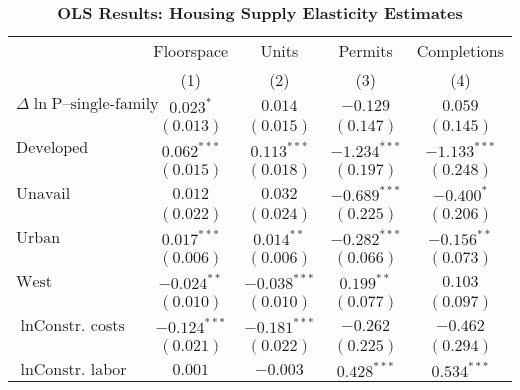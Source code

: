 
\begin{table}[H]
\caption{\textbf{OLS Results: Housing Supply Elasticity Estimates}}
\begin{center}
\begin{footnotesize}
\begin{threeparttable}
\begin{tabular}{l c c c c}
\toprule
 & \multicolumn{1}{c}{Floorspace} & \multicolumn{1}{c}{Units} & \multicolumn{1}{c}{Permits} & \multicolumn{1}{c}{Completions} \\
\cmidrule(lr){2-2} \cmidrule(lr){3-3} \cmidrule(lr){4-4} \cmidrule(lr){5-5}
 & (1) & (2) & (3) & (4) \\
\midrule
$\Delta\ln{\text{P--single-family}}$ & $0.023^{*}$    & $0.014$        & $-0.129$       & $0.059$        \\
                                     & $(0.013)$      & $(0.015)$      & $(0.147)$      & $(0.145)$      \\
$\text{Developed}$                   & $0.062^{***}$  & $0.113^{***}$  & $-1.234^{***}$ & $-1.133^{***}$ \\
                                     & $(0.015)$      & $(0.018)$      & $(0.197)$      & $(0.248)$      \\
$\text{Unavail}$                     & $0.012$        & $0.032$        & $-0.689^{***}$ & $-0.400^{*}$   \\
                                     & $(0.022)$      & $(0.024)$      & $(0.225)$      & $(0.206)$      \\
$\text{Urban}$                       & $0.017^{***}$  & $0.014^{**}$   & $-0.282^{***}$ & $-0.156^{**}$  \\
                                     & $(0.006)$      & $(0.006)$      & $(0.066)$      & $(0.073)$      \\
$\text{West}$                        & $-0.024^{**}$  & $-0.038^{***}$ & $0.199^{**}$   & $0.103$        \\
                                     & $(0.010)$      & $(0.010)$      & $(0.077)$      & $(0.097)$      \\
$\ln{\text{Constr. costs}}$          & $-0.124^{***}$ & $-0.181^{***}$ & $-0.262$       & $-0.462$       \\
                                     & $(0.021)$      & $(0.022)$      & $(0.225)$      & $(0.294)$      \\
$\ln{\text{Constr. labor}}$          & $0.001$        & $-0.003$       & $0.428^{***}$  & $0.534^{***}$  \\

\end{tabular}
\end{threeparttable}
\end{footnotesize}
\end{center}
\end{table}
